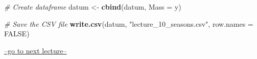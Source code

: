 \documentclass[
]{article}
\newenvironment{Shaded}{\begin{snugshade}}{\end{snugshade}}
\newcommand{\AttributeTok}[1]{\textcolor[rgb]{0.13,0.29,0.53}{#1}}
\newcommand{\CommentTok}[1]{\textcolor[rgb]{0.56,0.35,0.01}{\textit{#1}}}
\newcommand{\ConstantTok}[1]{\textcolor[rgb]{0.56,0.35,0.01}{#1}}
\newcommand{\FunctionTok}[1]{\textcolor[rgb]{0.13,0.29,0.53}{\textbf{#1}}}
\newcommand{\NormalTok}[1]{#1}
\newcommand{\OtherTok}[1]{\textcolor[rgb]{0.56,0.35,0.01}{#1}}
\newcommand{\StringTok}[1]{\textcolor[rgb]{0.31,0.60,0.02}{#1}}
\begin{document}
\begin{Shaded}
\begin{Highlighting}[]
\CommentTok{\# Create dataframe}
\NormalTok{datum }\OtherTok{\textless{}{-}} \FunctionTok{cbind}\NormalTok{(datum, }\AttributeTok{Mass =}\NormalTok{ y)}

\CommentTok{\# Save the CSV file}
\FunctionTok{write.csv}\NormalTok{(datum, }\StringTok{"lecture\_10\_seasons.csv"}\NormalTok{, }\AttributeTok{row.names =} \ConstantTok{FALSE}\NormalTok{)}
\end{Highlighting}
\end{Shaded}

\href{lecture_11.html}{--go to next lecture--}
\end{document}
